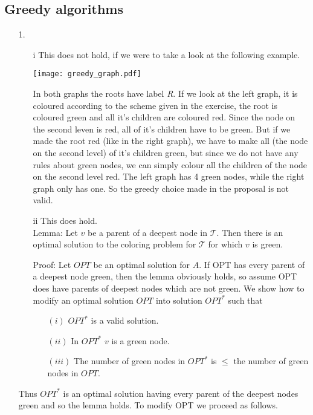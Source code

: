 \documentclass{article}
\begin{document}
\subsection*{Greedy algorithms}
\begin{itemize}
\item[1.] 

\begin{itemize}	
\item[i] This does not hold, if we were to take a look at the following example. 

\texttt{[image: greedy\_graph.pdf]}

In both graphs the roots have label \emph{R}. If we look at the left graph, it is coloured according to the scheme given in the exercise, the root is coloured green and all it's children are coloured red. Since the node on the second leven is red, all of it's children have to be green. But if we made the root red (like in the right graph), we have to make all (the node on the second level) of it's children green, but since we do not have any rules about green nodes, we can simply colour all the children of the node on the second level red. The left graph has 4 green nodes, while the right graph only has one. So the greedy choice made in the proposal is not valid.

\item[ii] This does hold. \\
Lemma: Let $v$ be a parent of a deepest node in $\mathcal{T}$. Then there is an optimal solution to the coloring problem for $\mathcal{T}$ for which $v$ is green.

Proof: Let $OPT$ be an optimal solution for $A$. If OPT has every parent of a deepest node green, then the lemma obviously holds, so assume OPT does have parents of deepest nodes which are not green. We show how to modify an optimal solution $OPT$ into solution $OPT^*$ such that
\begin{itemize}
\item[$(i)$] $OPT^*$ is a valid solution.
\item[$(ii)$] In $OPT^*$ $v$ is a green node. 
\item[$(iii)$] The number of green nodes in $OPT^*$ is $\le$ the number of green nodes in $OPT$.
\end{itemize}
\end{itemize}

Thus $OPT^*$ is an optimal solution having every parent of the deepest nodes green and so the lemma holds. To modify OPT we proceed as follows.


\end{itemize}
\end{document}
